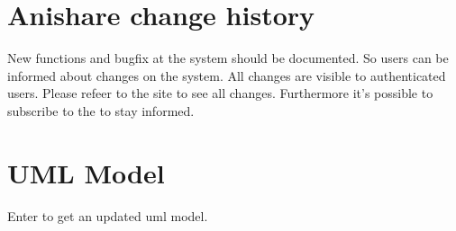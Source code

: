 \documentclass[letterpaper,10pt,openany,oneside,english]{sphinxmanual}
\begin{document}
\noindent{}


\section{Anishare change history}
\label{\detokenize{index:anishare-change-history}}
New functions and bugfix at the system should be documented. So users can be informed about changes on the system.
All changes are visible to authenticated users. Please refeer to the site  to see all changes. Furthermore it’s possible to subscribe to
the  to stay informed.


\section{UML Model}
\label{\detokenize{index:uml-model}}
Enter  to get an updated uml model.

\noindent{}



\renewcommand{\indexname}{Index}
\printindex
\end{document}
